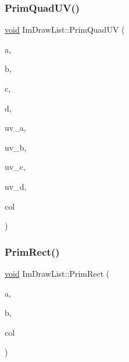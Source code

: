 \mbox{\label{structImDrawList_a9df27414aaca5f34ac3664a8b82582b5}} 
\subsubsection{\texorpdfstring{Prim\+Quad\+U\+V()}{PrimQuadUV()}}
{\footnotesize\ttfamily \hyperlink{imgui__impl__opengl3__loader_8h_ac668e7cffd9e2e9cfee428b9b2f34fa7}{void} Im\+Draw\+List\+::\+Prim\+Quad\+UV (\begin{DoxyParamCaption}\item[{const \hyperlink{structImVec2}{Im\+Vec2} \&}]{a,  }\item[{const \hyperlink{structImVec2}{Im\+Vec2} \&}]{b,  }\item[{const \hyperlink{structImVec2}{Im\+Vec2} \&}]{c,  }\item[{const \hyperlink{structImVec2}{Im\+Vec2} \&}]{d,  }\item[{const \hyperlink{structImVec2}{Im\+Vec2} \&}]{uv\+\_\+a,  }\item[{const \hyperlink{structImVec2}{Im\+Vec2} \&}]{uv\+\_\+b,  }\item[{const \hyperlink{structImVec2}{Im\+Vec2} \&}]{uv\+\_\+c,  }\item[{const \hyperlink{structImVec2}{Im\+Vec2} \&}]{uv\+\_\+d,  }\item[{Im\+U32}]{col }\end{DoxyParamCaption})}

\mbox{\label{structImDrawList_ae2be093563f1d20b8190b7c423113925}} 
\subsubsection{\texorpdfstring{Prim\+Rect()}{PrimRect()}}
{\footnotesize\ttfamily \hyperlink{imgui__impl__opengl3__loader_8h_ac668e7cffd9e2e9cfee428b9b2f34fa7}{void} Im\+Draw\+List\+::\+Prim\+Rect (\begin{DoxyParamCaption}\item[{const \hyperlink{structImVec2}{Im\+Vec2} \&}]{a,  }\item[{const \hyperlink{structImVec2}{Im\+Vec2} \&}]{b,  }\item[{Im\+U32}]{col }\end{DoxyParamCaption})}

